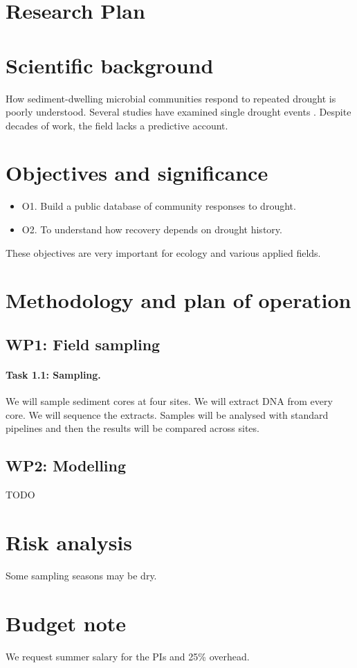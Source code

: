 \documentclass[12pt,a4paper]{article}
\begin{document}
\section*{Research Plan}

\section{Scientific background}
How sediment-dwelling microbial communities respond to repeated drought is poorly
understood. Several studies have examined single drought events \cite{}. Despite decades of
work, the field lacks a predictive account.

\section{Objectives and significance}
\begin{itemize}
\item O1. Build a public database of community responses to drought.
\item O2. To understand how recovery depends on drought history.
\end{itemize}
These objectives are very important for ecology and various applied fields.

\section{Methodology and plan of operation}
\subsection{WP1: Field sampling}
\paragraph{Task 1.1: Sampling.}
We will sample sediment cores at four sites. We will extract DNA from every core. We will
sequence the extracts. Samples will be analysed with standard pipelines and then the results
will be compared across sites.

\subsection{WP2: Modelling}
TODO

\section{Risk analysis}
Some sampling seasons may be dry.

\section*{Budget note}
We request summer salary for the PIs and 25\% overhead.
\end{document}
